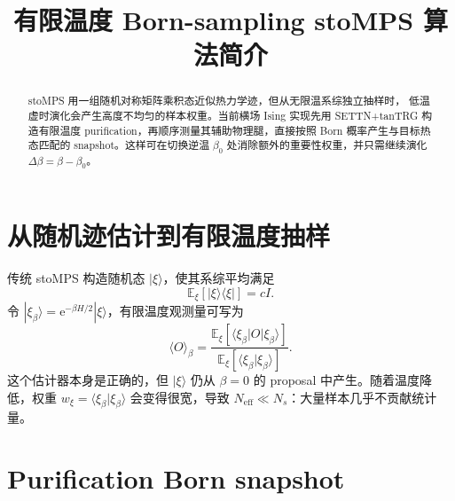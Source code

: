 \documentclass[11pt,a4paper,UTF8,fontset=fandol]{ctexart}
\title{有限温度 Born-sampling stoMPS 算法简介}
\author{}
\date{}
\newcommand{\ee}{\mathrm e}
\begin{document}
\maketitle
\vspace{-2.5em}

\begin{abstract}
stoMPS 用一组随机对称矩阵乘积态近似热力学迹，但从无限温系综独立抽样时，
低温虚时演化会产生高度不均匀的样本权重。当前横场 Ising 实现先用
SETTN+tanTRG 构造有限温度 purification，再顺序测量其辅助物理腿，直接按照
Born 概率产生与目标热态匹配的 snapshot。这样可在切换逆温
$\beta_0$ 处消除额外的重要性权重，并只需继续演化
$\Delta\beta=\beta-\beta_0$。
\end{abstract}

\section{从随机迹估计到有限温度抽样}

传统 stoMPS 构造随机态 $|\xi\rangle$，使其系综平均满足
\begin{equation}
    \mathbb E_{\xi}\!\left[|\xi\rangle\langle\xi|\right]=cI .
\end{equation}
令 $|\xi_\beta\rangle=\ee^{-\beta H/2}|\xi\rangle$，有限温度观测量可写为
\begin{equation}
    \langle O\rangle_\beta=
    \frac{\mathbb E_{\xi}
    [\langle\xi_\beta|O|\xi_\beta\rangle]}
    {\mathbb E_{\xi}
    [\langle\xi_\beta|\xi_\beta\rangle]} .
    \label{eq:stochastic_trace}
\end{equation}
这个估计器本身是正确的，但 $|\xi\rangle$ 仍从 $\beta=0$ 的 proposal
中产生。随着温度降低，权重
$w_\xi=\langle\xi_\beta|\xi_\beta\rangle$ 会变得很宽，导致
$N_{\mathrm{eff}}\ll N_s$：大量样本几乎不贡献统计量。

\section{Purification Born snapshot}
\end{document}
